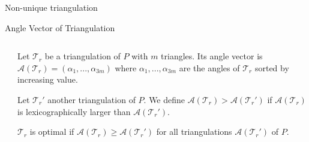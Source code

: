 \documentclass[10pt]{beamer}
\begin{document}
\begin{frame}{Non-unique triangulation}
\begin{figure}[h]
\begin{minipage}[h]{0.49\linewidth}
		\end{minipage}
	\end{figure}
\end{frame}

\begin{frame}{Angle Vector of Triangulation}
	\begin{columns}
		\begin{column}{0.4\textwidth} 
		\end{column}
		\begin{column}{0.6\textwidth} 
			Let $\mathcal{T}_r$ be a triangulation of $P$ with $m$ triangles. 
			Its \alert{angle vector} is $\mathcal{A}(\mathcal{T}_r)=(\alpha_1,...,\alpha_{3m})$
			where $\alpha_1,...,\alpha_{3m}$ are the angles of $\mathcal{T}_r$ 
			sorted by increasing value.
			\bigskip
	
			Let $\mathcal{T}_r'$  another triangulation of $P$. 
			We define $\mathcal{A}(\mathcal{T}_r) > \mathcal{A}(\mathcal{T}_r')$ 
			if $\mathcal{A}(\mathcal{T}_r)$ is \alert{lexicographically} larger than
			$\mathcal{A}(\mathcal{T}_r')$.
			\bigskip
	
			$\mathcal{T}_r$ is \alert{optimal} 
			if $\mathcal{A}(\mathcal{T}_r) \geq \mathcal{A}(\mathcal{T}_r')$
			for all triangulations $\mathcal{A}(\mathcal{T}_r')$ of $P$. 		
		\end{column}
	\end{columns}
\end{frame}
\end{document}
